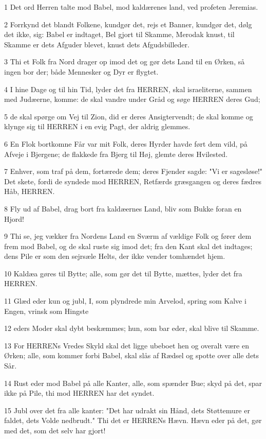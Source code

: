 \par 1 Det ord Herren talte mod Babel, mod kaldærenes land, ved profeten Jeremias.
\par 2 Forrkynd det blandt Folkene, kundgør det, rejs et Banner, kundgør det, dølg det ikke, sig: Babel er indtaget, Bel gjort til Skamme, Merodak knust, til Skamme er dets Afguder blevet, knust dets Afgudsbilleder.
\par 3 Thi et Folk fra Nord drager op imod det og gør dets Land til en Ørken, så ingen bor der; både Mennesker og Dyr er flygtet.
\par 4 I hine Dage og til hin Tid, lyder det fra HERREN, skal israeliterne, sammen med Judæerne, komme: de skal vandre under Gråd og søge HERREN deres Gud;
\par 5 de skal spørge om Vej til Zion, did er deres Ansigtervendt; de skal komme og klynge sig til HERREN i en evig Pagt, der aldrig glemmes.
\par 6 En Flok bortkomne Får var mit Folk, deres Hyrder havde ført dem vild, på Afveje i Bjergene; de flakkede fra Bjerg til Høj, glemte deres Hvilested.
\par 7 Enhver, som traf på dem, fortærede dem; deres Fjender sagde: "Vi er sagesløse!" Det skete, fordi de syndede mod HERREN, Retfærds græsgangen og deres fædres Håb, HERREN.
\par 8 Fly ud af Babel, drag bort fra kaldæernes Land, bliv som Bukke foran en Hjord!
\par 9 Thi se, jeg vækker fra Nordens Land en Sværm af vældige Folk og fører dem frem mod Babel, og de skal ruste sig imod det; fra den Kant skal det indtages; dens Pile er som den sejrsæle Helts, der ikke vender tomhændet hjem.
\par 10 Kaldæa gøres til Bytte; alle, som gør det til Bytte, mættes, lyder det fra HERREN.
\par 11 Glæd eder kun og jubl, I, som plyndrede min Arvelod, spring som Kalve i Engen, vrinsk som Hingste
\par 12 eders Moder skal dybt beskæmmes; hun, som bar eder, skal blive til Skamme.
\par 13 For HERRENs Vredes Skyld skal det ligge ubeboet hen og overalt være en Ørken; alle, som kommer forbi Babel, skal slås af Rædsel og spotte over alle dets Sår.
\par 14 Rust eder mod Babel på alle Kanter, alle, som spænder Bue; skyd på det, spar ikke på Pile, thi mod HERREN har det syndet.
\par 15 Jubl over det fra alle kanter: "Det har udrakt sin Hånd, dets Støttemure er faldet, dets Volde nedbrudt." Thi det er HERRENs Hævn. Hævn eder på det, gør med det, som det selv har gjort!
